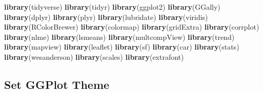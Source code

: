 \documentclass[12pt,]{article}
\newenvironment{Shaded}{\begin{snugshade}}{\end{snugshade}}
\newcommand{\KeywordTok}[1]{\textcolor[rgb]{0.13,0.29,0.53}{\textbf{#1}}}
\newcommand{\NormalTok}[1]{#1}
\begin{document}
\begin{Shaded}
\begin{Highlighting}[]
\KeywordTok{library}\NormalTok{(tidyverse)}
\KeywordTok{library}\NormalTok{(tidyr)}
\KeywordTok{library}\NormalTok{(ggplot2)}
\KeywordTok{library}\NormalTok{(GGally)}
\KeywordTok{library}\NormalTok{(dplyr)}
\KeywordTok{library}\NormalTok{(plyr)}
\KeywordTok{library}\NormalTok{(lubridate)}
\KeywordTok{library}\NormalTok{(viridis)}
\KeywordTok{library}\NormalTok{(RColorBrewer)}
\KeywordTok{library}\NormalTok{(colormap)}
\KeywordTok{library}\NormalTok{(gridExtra)}
\KeywordTok{library}\NormalTok{(corrplot)}
\KeywordTok{library}\NormalTok{(nlme)}
\KeywordTok{library}\NormalTok{(lsmeans)}
\KeywordTok{library}\NormalTok{(multcompView)}
\KeywordTok{library}\NormalTok{(trend)}
\KeywordTok{library}\NormalTok{(mapview)}
\KeywordTok{library}\NormalTok{(leaflet)}
\KeywordTok{library}\NormalTok{(sf)}
\KeywordTok{library}\NormalTok{(car)}
\KeywordTok{library}\NormalTok{(stats)}
\KeywordTok{library}\NormalTok{(wesanderson)}
\KeywordTok{library}\NormalTok{(scales)}
\KeywordTok{library}\NormalTok{(extrafont)}
\end{Highlighting}
\end{Shaded}

\subsection{Set GGPlot Theme}\label{set-ggplot-theme}
\end{document}
